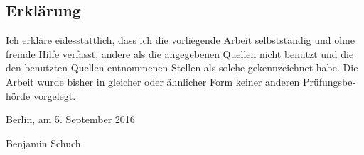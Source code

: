 \begin{german}
\chapter*{Erkl\"arung}
\noindent
Ich erkl\"are eidesstattlich, dass ich die vorliegende Arbeit selbstst\"andig und ohne fremde Hilfe verfasst, 
andere als die angegebenen Quellen nicht benutzt und die den benutzten Quellen entnommenen Stellen als 
solche gekennzeichnet habe. Die Arbeit wurde bisher in gleicher oder \"ahnlicher Form keiner anderen 
Pr\"ufungsbeh\"orde vorgelegt.
\par
\vspace{10mm}
\noindent
Berlin, am 5. September 2016
\par
\vspace{12mm}
\noindent
Benjamin Schuch
\end{german}